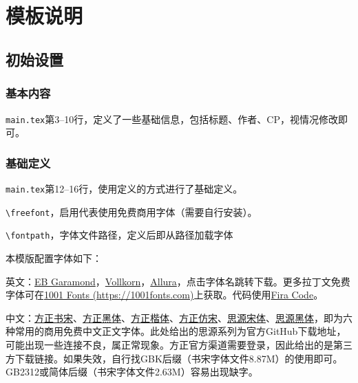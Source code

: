 \documentclass[10pt,openany]{book}
\title{\mytitleen\\\mytitle}
\author{\myauthor}
\date{}
\def\costomizetitlepage{} %
\begin{document}
\pagestyle{mystyle}

\ifdefined\costomizetitlepage
    
\else
    \maketitle
\fi

\tocgeo
\tableofcontents
\thispagestyle{empty}

\cleardoublepage
\setcounter{page}{1}
\restoregeometry

\part{模板说明}

\chapter{初始设置}

\section{基本内容}

\texttt{main.tex}第3--10行，定义了一些基础信息，包括标题、作者、CP，视情况修改即可。

\section{基础定义}

\texttt{main.tex}第12--16行，使用定义的方式进行了基础定义。

\texttt{\textbackslash freefont}，启用代表使用免费商用字体（需要自行安装）。

\texttt{\textbackslash fontpath}，字体文件路径，定义后即从路径加载字体

本模版配置字体如下：

英文：\href{https://www.1001fonts.com/eb-garamond-font.html}{EB Garamond}，\href{https://www.1001fonts.com/vollkorn-font.html}{Vollkorn}，\href{https://www.1001fonts.com/allura-font.html}{Allura}，点击字体名跳转下载。更多拉丁文免费字体可在\href{https://1001fonts.com}{1001 Fonts (https://1001fonts.com)}上获取。代码使用\href{https://github.com/tonsky/FiraCode/releases/latest}{Fira Code}。

中文：\href{https://www.fonts.net.cn/font-31610316242.html}{方正书宋}、\href{https://www.fonts.net.cn/font-31609167689.html}{方正黑体}、\href{https://www.fonts.net.cn/font-31607222283.html}{方正楷体}、\href{https://www.fonts.net.cn/font-31602268591.html}{方正仿宋}、\href{https://github.com/adobe-fonts/source-han-serif/releases/latest}{思源宋体}、\href{https://github.com/adobe-fonts/source-han-sans/releases/latest}{思源黑体}，即为六种常用的商用免费中文正文字体。此处给出的思源系列为官方GitHub下载地址，可能出现一些连接不良，属正常现象。方正官方渠道需要登录，因此给出的是第三方下载链接。如果失效，自行找GBK后缀（书宋字体文件8.87M）的使用即可。GB2312或简体后缀（书宋字体文件2.63M）容易出现缺字。
\end{document}
